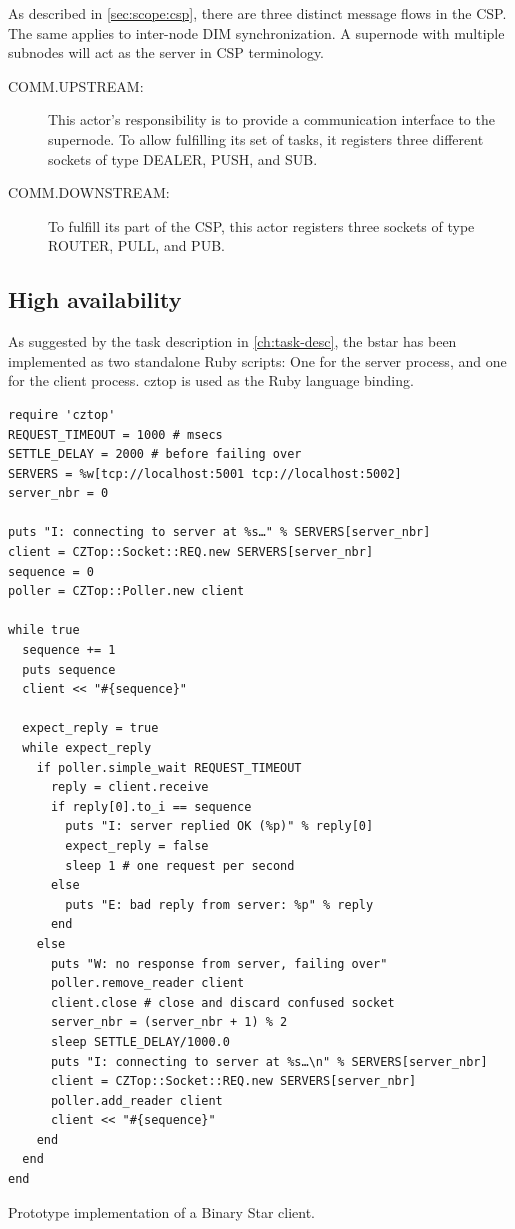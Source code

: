 As described in \autoref{sec:scope:csp}, there are three distinct message flows
in the \gls{CSP}. The same applies to inter-node DIM synchronization. A
supernode with multiple subnodes will act as the server in CSP terminology.

\begin{description}
	\item [COMM.UPSTREAM:]
		This actor's responsibility is to provide a communication
		interface to the supernode. To allow fulfilling its set of
		tasks, it registers three different sockets of type
		DEALER, PUSH, and SUB.

	\item [COMM.DOWNSTREAM:]
		To fulfill its part of the CSP, this actor registers
		three sockets of type ROUTER, PULL, and PUB.
\end{description}


\subsection{High availability}
As suggested by the task description in \autoref{ch:task-desc}, the
\gls{bstar} has been implemented as two standalone Ruby scripts: One for the
server process, and one for the client process. \gls{cztop} is used as the \zmq
Ruby language binding.

\begin{listing}[H]
	\begin{verbatim}
require 'cztop'
REQUEST_TIMEOUT = 1000 # msecs
SETTLE_DELAY = 2000 # before failing over
SERVERS = %w[tcp://localhost:5001 tcp://localhost:5002]
server_nbr = 0

puts "I: connecting to server at %s…" % SERVERS[server_nbr]
client = CZTop::Socket::REQ.new SERVERS[server_nbr]
sequence = 0
poller = CZTop::Poller.new client

while true
  sequence += 1
  puts sequence
  client << "#{sequence}"

  expect_reply = true
  while expect_reply
    if poller.simple_wait REQUEST_TIMEOUT
      reply = client.receive
      if reply[0].to_i == sequence
        puts "I: server replied OK (%p)" % reply[0]
        expect_reply = false
        sleep 1 # one request per second
      else
        puts "E: bad reply from server: %p" % reply
      end
    else
      puts "W: no response from server, failing over"
      poller.remove_reader client
      client.close # close and discard confused socket
      server_nbr = (server_nbr + 1) % 2
      sleep SETTLE_DELAY/1000.0
      puts "I: connecting to server at %s…\n" % SERVERS[server_nbr]
      client = CZTop::Socket::REQ.new SERVERS[server_nbr]
      poller.add_reader client
      client << "#{sequence}"
    end
  end
end
	\end{verbatim}
	\caption{Prototype implementation of a Binary Star client.}
	\label{lst:proto:bstar:client}
\end{listing}

